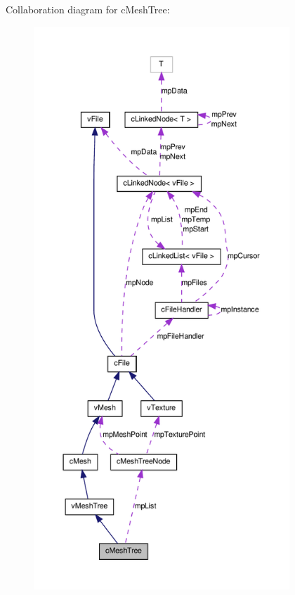 Collaboration diagram for cMeshTree:
\nopagebreak
\begin{figure}[H]
\begin{center}
\leavevmode
\includegraphics[height=600pt]{classc_mesh_tree__coll__graph}
\end{center}
\end{figure}
